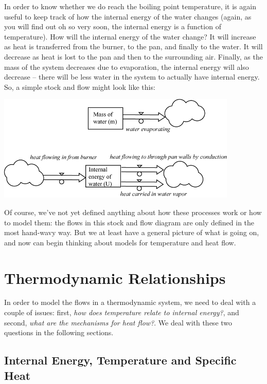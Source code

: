 In order to know whether we do reach the boiling point temperature, it is again useful to keep track of how the internal energy of the water changes (again, as you will find out oh so very soon, the internal energy is a function of temperature). How will the internal energy of the water change? It will increase as heat is transferred from the burner, to the pan, and finally to the water. It will decrease as heat is lost to the pan and then to the surrounding air. Finally, as the mass of the system decreases due to evaporation, the internal energy will also decrease -- there will be less water in the system to actually have internal energy.  So, a simple stock and flow might look like this:

\beforefig
 \centerline{\includegraphics[height=2in]{figs/WaterInPanSimple}}
\afterfig

Of course, we've not yet defined anything about how these processes work or how to model them: the flows in this stock and flow diagram are only defined in the most hand-wavy way.  But we at least have a general picture of what is going on, and now can begin thinking about models for temperature and heat flow.

\section{Thermodynamic Relationships}

In order to model the flows in a thermodynamic system, we need to deal with a couple of issues:  first, {\it how does temperature relate to internal energy?}, and second, {\it what are the mechanisms for heat flow?}.  We deal with these two questions in the following sections.


\subsection{Internal Energy, Temperature and Specific Heat}

